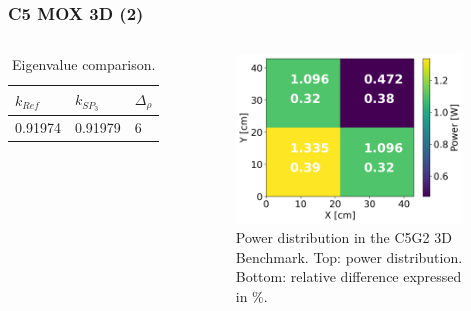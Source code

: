 \begin{frame}
\frametitle{C5 MOX 3D (2)}

\begin{columns}
    \column[t]{4cm}
    \begin{table}[htbp!]
      \centering
      \caption{Eigenvalue comparison.}
      \begin{tabular}{lll}
      \toprule
        $k_{Ref}$ & $k_{SP_3}$  & $\Delta_{\rho}$ \\
      \midrule
        0.91974   & 0.91979     & 6               \\
      \bottomrule
      \end{tabular}
    \end{table}

    \column[t]{6cm}
    \begin{figure}[htbp!]
        \begin{center}
            \includegraphics[width=6cm]{figures/C5G23D-distrib}
        \end{center}
        \caption{Power distribution in the C5G2 3D Benchmark. Top: power distribution. Bottom: relative difference expressed in \%.}
    \end{figure}
\end{columns}
\end{frame}
